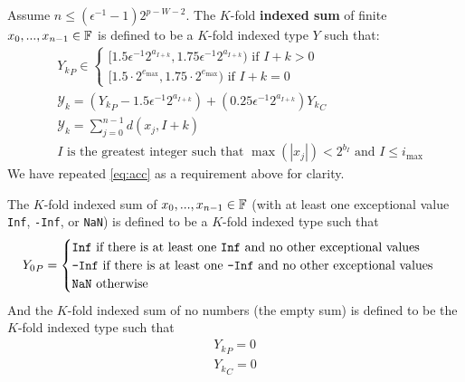       \begin{samepage}
      \begin{definition}
      Assume $n \leq (\epsilon^{-1} - 1)2^{p - W - 2}$. The $K$-fold \textbf{indexed sum} of finite $x_0, ..., x_{n - 1} \in \mathbb{F}$ is defined to be a $K$-fold indexed type $Y$ such that:
      \begin{equation}
      \begin{aligned}
        &{Y_k}_P \in \begin{cases}[1.5  \epsilon^{-1} 2^{a_{I + k}}, 1.75  \epsilon^{-1} 2^{a_{I + k}}) \text{ if } I + k > 0 \\ [1.5 \cdot 2^{e_{\max}}, 1.75 \cdot 2^{e_{\max}}) \text{ if } I + k = 0\end{cases}\\
        &\mathcal{Y}_k = ({Y_k}_P - 1.5 \epsilon^{-1}2^{a_{I + k}}) + (0.25\epsilon^{-1}2^{a_{I + k}}){Y_k}_C\\
        &\mathcal{Y}_k = \sum\limits_{j = 0}^{n - 1}d(x_j, I + k)\\
        & I\text{ is the greatest integer such that }\max(|x_j|) < 2^{b_I} \text{ and } I \leq i_{\max}
      \end{aligned}
      \label{eq:indexed_sum}
      \end{equation}
      We have repeated \eqref{eq:acc} as a requirement above for clarity.

      The $K$-fold indexed sum of $x_0, ..., x_{n - 1} \in \mathbb{F}$ (with at least one exceptional value \texttt{Inf}, \texttt{-Inf}, or \texttt{NaN}) is defined to be a $K$-fold indexed type such that
      \begin{equation}
        {Y_0}_P = \begin{cases}\texttt{Inf} \text{ if there is at least one \texttt{Inf} and no other exceptional values}\\ \texttt{-Inf} \text{ if there is at least one \texttt{-Inf} and no other exceptional values}\\ \texttt{NaN}\text{ otherwise}\end{cases} \label{eq:indexed_sum_exceptional}
      \end{equation}
      And the $K$-fold indexed sum of no numbers (the empty sum) is defined to be the $K$-fold indexed type such that
      \begin{align}
        {Y_k}_P = 0\nonumber\\
        {Y_k}_C = 0\nonumber\\
        \label{eq:indexed_sum_zero}
      \end{align}
      \end{definition}
      \end{samepage}

